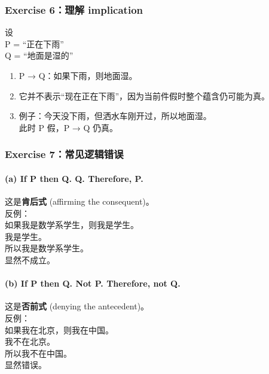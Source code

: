 \documentclass[
  11pt,
]{article}
\providecommand{\tightlist}{%
  \setlength{\itemsep}{0pt}\setlength{\parskip}{0pt}}
\begin{document}
\subsubsection{Exercise 6：理解
implication}\label{exercise-6ux7406ux89e3-implication}

设\\
P = ``正在下雨''\\
Q = ``地面是湿的''

\begin{enumerate}
\def\labelenumi{\arabic{enumi}.}
\tightlist
\item
  P → Q：如果下雨，则地面湿。
\item
  它并不表示``现在正在下雨''，因为当前件假时整个蕴含仍可能为真。
\item
  例子：今天没下雨，但洒水车刚开过，所以地面湿。\\
  此时 P 假，P → Q 仍真。
\end{enumerate}

\subsubsection{Exercise
7：常见逻辑错误}\label{exercise-7ux5e38ux89c1ux903bux8f91ux9519ux8bef}

\paragraph{(a) If P then Q. Q. Therefore,
P.}\label{a-if-p-then-q.-q.-therefore-p.}

这是\textbf{肯后式} (affirming the consequent)。\\
反例：\\
如果我是数学系学生，则我是学生。\\
我是学生。\\
所以我是数学系学生。\\
显然不成立。

\paragraph{(b) If P then Q. Not P. Therefore, not
Q.}\label{b-if-p-then-q.-not-p.-therefore-not-q.}

这是\textbf{否前式} (denying the antecedent)。\\
反例：\\
如果我在北京，则我在中国。\\
我不在北京。\\
所以我不在中国。\\
显然错误。
\end{document}
